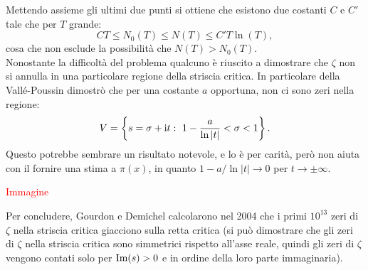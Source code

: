 \documentclass[11pt]{book}
\theoremstyle{Definizione}
\theoremstyle{TeoremaProposizioneLemmaCorollarioCongettura}
\theoremstyle{OsservazioneNotaEsempio}
\renewcommand{\Im}{\textup{Im}}
\renewcommand{\i}{\textup{i}}
\begin{document}
Mettendo assieme gli ultimi due punti si ottiene che esistono due costanti $C$ e $C'$ tale che per $T$ grande:
$$
C T \leq N_0(T) \leq N(T)\leq C' T\ln(T),
$$
cosa che non esclude la possibilità che $N(T) > N_0(T)$.\\
Nonostante la difficoltà del problema qualcuno è riuscito a dimostrare che $\zeta$ non si annulla in una particolare regione della striscia critica. In particolare della Vallé-Poussin dimostrò che per una costante $a$ opportuna, non ci sono zeri nella regione:
$$
V = \left\{s = \sigma + \i t:\  1-\frac{a}{\ln|t|}<\sigma < 1\right\}.
$$
Questo potrebbe sembrare un risultato notevole, e lo è per carità, però non aiuta con il fornire una stima a $\pi(x)$, in quanto $1-a/\ln|t|\to 0$ per $t \to \pm \infty$.
\begin{center}
\textcolor{red}{Immagine}
\end{center}
Per concludere, Gourdon e Demichel calcolarono nel 2004 che i primi $10^{13}$ zeri di $\zeta$ nella striscia critica giacciono sulla retta critica (si può dimostrare che gli zeri di $\zeta$ nella striscia critica sono simmetrici rispetto all'asse reale, quindi gli zeri di $\zeta$ vengono contati solo per $\Im(s) > 0$ e in ordine della loro parte immaginaria).
\end{document}
